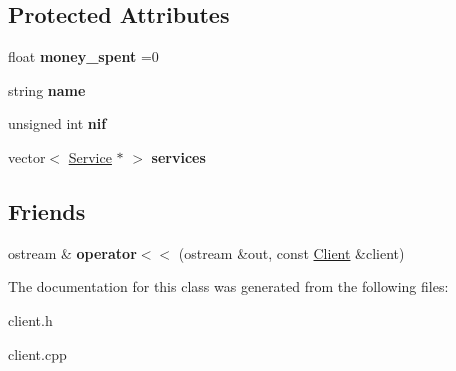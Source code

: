 \subsection*{Protected Attributes}
\begin{DoxyCompactItemize}
\item 
\mbox{\label{class_client_a9d5dc70a6eee2fded8217a7983fe5fd0}} 
float {\bfseries money\+\_\+spent} =0
\item 
\mbox{\label{class_client_a456e36f9972a8bf3ecdb5f0e70b3bd5d}} 
string {\bfseries name}
\item 
\mbox{\label{class_client_a1c94dc96a56cb5032573fb1d528517c2}} 
unsigned int {\bfseries nif}
\item 
\mbox{\label{class_client_a02b601f12b9905edae7e64ded9bde912}} 
vector$<$ \hyperlink{class_service}{Service} $\ast$ $>$ {\bfseries services}
\end{DoxyCompactItemize}
\subsection*{Friends}
\begin{DoxyCompactItemize}
\item 
\mbox{\label{class_client_a001b1071dc56da194d697f845bbc4b1b}} 
ostream \& {\bfseries operator$<$$<$} (ostream \&out, const \hyperlink{class_client}{Client} \&client)
\end{DoxyCompactItemize}


The documentation for this class was generated from the following files\+:\begin{DoxyCompactItemize}
\item 
client.\+h\item 
client.\+cpp\end{DoxyCompactItemize}
